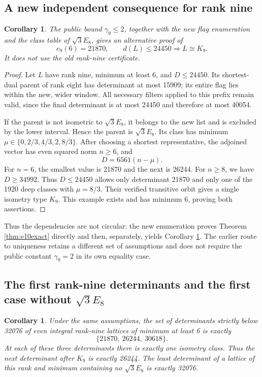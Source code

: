 \documentclass[11pt,a4paper]{article}
\newtheorem{corollary}[theorem]{Corollary}
\theoremstyle{remark}\newtheorem{remark}[theorem]{Remark}
\begin{document}
\subsection{A new independent consequence for rank nine}

\begin{corollary}\label{cor:newrank9}
The public bound $\gamma_9\le2$, together with the new flag enumeration and the class table of $\sqrt3E_8$, gives an alternative proof of
\[
e_9(6)=21870,\qquad d(L)\le24450\Longrightarrow L\cong K_9.
\]
It does not use the old rank-nine certificate.
\end{corollary}

\begin{proof}
Let $L$ have rank nine, minimum at least 6, and $D\le24450$. Its shortest-dual parent of rank eight has determinant at most 15909; its entire flag lies within the new, wider window. All necessary filters applied to this prefix remain valid, since the final determinant is at most 24450 and therefore at most 40054.

If the parent is not isometric to $\sqrt3E_8$, it belongs to the new list and is excluded by the lower interval. Hence the parent is $\sqrt3E_8$. Its class has minimum $\mu\in\{0,2/3,4/3,2,8/3\}$. After choosing a shortest representative, the adjoined vector has even squared norm $n\ge6$, and
\[
D=6561(n-\mu).
\]
For $n=6$, the smallest value is 21870 and the next is 26244. For $n\ge8$, we have $D\ge34992$. Thus $D\le24450$ allows only determinant 21870 and only one of the 1920 deep classes with $\mu=8/3$. Their verified transitive orbit gives a single isometry type $K_9$. This example exists and has minimum 6, proving both assertions.
\end{proof}

Thus the dependencies are not circular: the new enumeration proves Theorem \ref{thm:e10exact} directly and then, separately, yields Corollary \ref{cor:newrank9}. The earlier route to uniqueness retains a different set of assumptions and does not require the public constant $\gamma_9=2$ in its own equality case.

\subsection{The first rank-nine determinants and the first case without \texorpdfstring{$\sqrt3E_8$}{sqrt(3)E8}}

\begin{corollary}\label{cor:spectrum9}
Under the same assumptions, the set of determinants strictly below 32076 of even integral rank-nine lattices of minimum at least 6 is exactly
\[
\{21870,\ 26244,\ 30618\}.
\]
At each of these three determinants there is exactly one isometry class. Thus the next determinant after $K_9$ is exactly 26244. The least determinant of a lattice of this rank and minimum containing no $\sqrt3E_8$ is exactly 32076.
\end{corollary}
\end{document}
